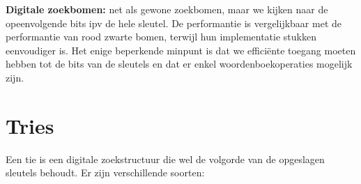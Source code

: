 \begin{mdframed}[leftmargin=10pt,rightmargin=10pt]
\textbf{Digitale zoekbomen:} net als gewone zoekbomen, maar we kijken naar de opeenvolgende bits ipv de hele sleutel. De performantie is vergelijkbaar met de performantie van rood zwarte bomen, terwijl hun implementatie stukken eenvoudiger is. Het enige beperkende minpunt is dat we effici\"ente toegang moeten hebben tot de bits van de sleutels en dat er enkel woordenboekoperaties mogelijk zijn.
\end{mdframed}
\clearpage
\section{Tries}
Een tie is een digitale zoekstructuur die wel de volgorde van de opgeslagen sleutels behoudt.
Er zijn verschillende soorten:

